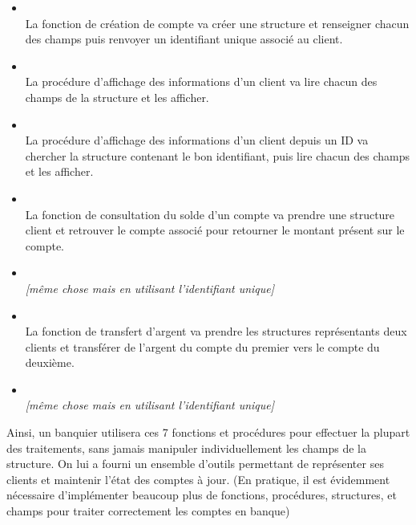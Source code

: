 \documentclass[11pt,a4paper]{article}
\begin{document}
\begin{itemize}
\item {}\\
      La fonction de création de compte va créer une structure et renseigner chacun des champs puis renvoyer un identifiant unique associé au client.
\item {}\\
      La procédure d'affichage des informations d'un client va lire chacun des champs de la structure et les afficher.
\item {}\\
      La procédure d'affichage des informations d'un client depuis un ID va chercher la structure contenant le bon identifiant, puis lire chacun des champs et les afficher.
\item {}\\
      La fonction de consultation du solde d'un compte va prendre une structure client et retrouver le compte associé pour retourner le montant présent sur le compte.
\item {}\\
      \textit{[même chose mais en utilisant l'identifiant unique]}
\item {}\\
      La fonction de transfert d'argent va prendre les structures représentants deux clients et transférer de l'argent du compte du premier vers le compte du deuxième.
\item {}\\
      \textit{[même chose mais en utilisant l'identifiant unique]}
\end{itemize}

Ainsi, un banquier utilisera ces 7 fonctions et procédures pour effectuer la plupart des traitements, sans jamais manipuler individuellement les champs de la structure.
On lui a fourni un ensemble d'outils permettant de représenter ses clients et maintenir l'état des comptes à jour.
(En pratique, il est évidemment nécessaire d'implémenter beaucoup plus de fonctions, procédures, structures, et champs pour traiter correctement les comptes en banque)

\bigskip

\end{document}
